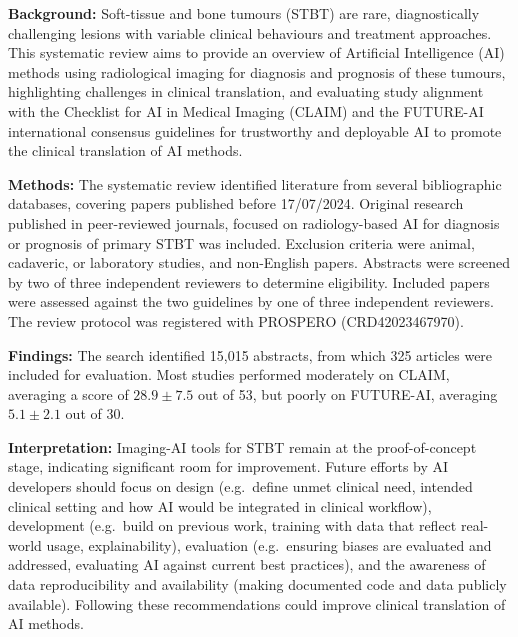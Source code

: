 \begin{ChapterAbstract}

	\textbf{Background:} Soft-tissue and bone tumours (STBT) are rare, diagnostically challenging lesions with variable clinical behaviours and treatment approaches.
	This systematic review aims to provide an overview of Artificial Intelligence (AI) methods using radiological imaging for diagnosis and prognosis of these tumours, highlighting challenges in clinical translation, and evaluating study alignment with the Checklist for AI in Medical Imaging (CLAIM) and the FUTURE-AI international consensus guidelines for trustworthy and deployable AI to promote the clinical translation of AI methods.

	\textbf{Methods:} The systematic review identified literature from several bibliographic databases, covering papers published before 17/07/2024.
	Original research published in peer-reviewed journals, focused on radiology-based AI for diagnosis or prognosis of primary STBT was included.
	Exclusion criteria were animal, cadaveric, or laboratory studies, and non-English papers.
	Abstracts were screened by two of three independent reviewers to determine eligibility.
	Included papers were assessed against the two guidelines by one of three independent reviewers.
	The review protocol was registered with PROSPERO (CRD42023467970).

	\textbf{Findings:} The search identified 15,015 abstracts, from which 325 articles were included for evaluation.
	Most studies performed moderately on CLAIM, averaging a score of $28.9 \pm 7.5$ out of 53, but poorly on FUTURE-AI, averaging $5.1 \pm 2.1$ out of 30.

	\textbf{Interpretation:} Imaging-AI tools for STBT remain at the proof-of-concept stage, indicating significant room for improvement.
	Future efforts by AI developers should focus on design (e.g.\ define unmet clinical need, intended clinical setting and how AI would be integrated in clinical workflow), development (e.g.\ build on previous work, training with data that reflect real-world usage, explainability), evaluation (e.g.\ ensuring biases are evaluated and addressed, evaluating AI against current best practices), and the awareness of data reproducibility and availability (making documented code and data publicly available).
	Following these recommendations could improve clinical translation of AI methods.
\end{ChapterAbstract}

